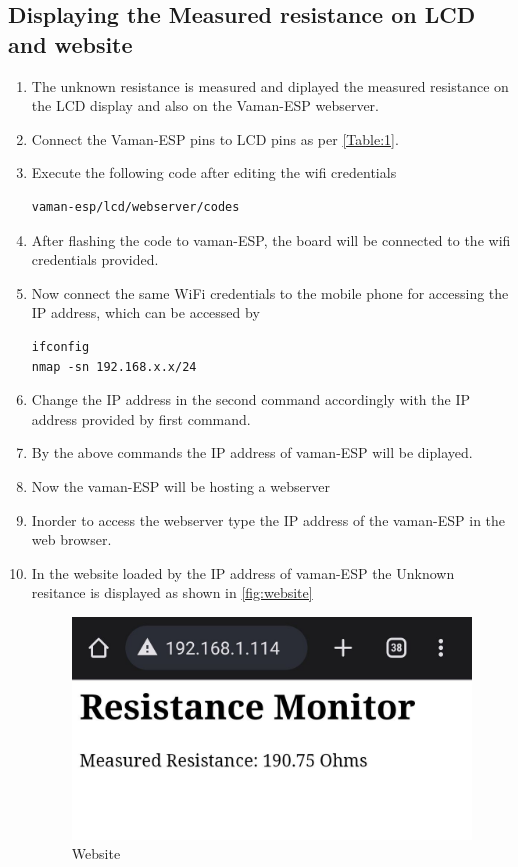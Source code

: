 \subsection{Displaying the Measured resistance on LCD and website}
\begin{enumerate}
\item The unknown resistance is measured and diplayed the measured resistance on
the LCD display and also on the Vaman-ESP webserver.
\item Connect the Vaman-ESP pins to LCD pins as per \autoref{Table:1}.
\item
Execute the following code after editing the wifi credentials

\begin{lstlisting}
vaman-esp/lcd/webserver/codes
\end{lstlisting}
\item After flashing the code to vaman-ESP, the board will be connected to the
wifi credentials provided.
\item Now connect the same WiFi credentials to the mobile phone for accessing
the IP address, which can be accessed by 
\begin{lstlisting}
ifconfig
nmap -sn 192.168.x.x/24
\end{lstlisting}
\item Change the IP address in the second command accordingly with the IP
address provided by first command.
\item By the above commands the IP address of vaman-ESP will be diplayed.
\item Now the vaman-ESP will be hosting a webserver
\item Inorder to access the webserver type the IP address of the vaman-ESP in
the web browser.
\item In the website loaded by the IP address of vaman-ESP the Unknown resitance
is displayed as shown in \autoref{fig:website}

\begin{figure}[!ht]
\centering
\includegraphics[width=\columnwidth]{vaman-esp32/lcd/figs/website.jpg}
\caption{Website}
\label{fig:website}
\end{figure}
\end{enumerate}

